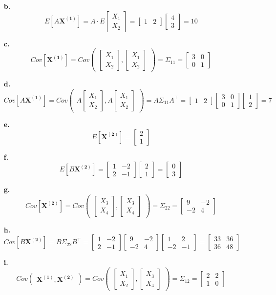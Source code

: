 \documentclass[oneside,12pt,letterpaper]{article}
\newcommand\m[1]{\begin{bmatrix}#1\end{bmatrix}}
\newcommand\p[1]{\begin{pmatrix}#1\end{pmatrix}}
\begin{document}
\begin{enumerate}
\begin{enumerate}
				\item[\textbf{b.}]
					$$E[A\boldsymbol{X^{(1)}}] 
					= A \cdot E\m{X_{1}\\X_{2}} 
					= \m{1&2} \m{4\\3} 
					= 10$$
				
				\item[\textbf{c.}]
					$$Cov[\boldsymbol{X^{(1)}}] 
					= Cov\p{\m{X_{1}\\X_{2}}, \m{X_{1}\\X_{2}}} 
					= \Sigma_{11} 
					= \m{3&0\\0&1}$$

				\item[\textbf{d.}]
					$$Cov[A\boldsymbol{X^{(1)}}] 
					= Cov\p{A\m{X_{1}\\X_{2}}, A\m{X_{1}\\X_{2}}} 
					= A\Sigma_{11}A^{\intercal} 
					= \m{1&2} \m{3&0\\0&1} \m{1\\2}
					= 7$$
	
				\item[\textbf{e.}]
					$$E[\boldsymbol{X^{(2)}}] 
					= \m{2\\1}$$

				\item[\textbf{f.}]
					$$E[B\boldsymbol{X^{(2)}}] 
					= \m{1&-2\\2&-1} \m{2\\1} 
					= \m{0\\3}$$
	
				\item[\textbf{g.}]
					$$Cov[\boldsymbol{X^{(2)}}] 
					= Cov\p{\m{X_{3}\\X_{4}}, \m{X_{3}\\X_{4}}} 
					= \Sigma_{22} 
					= \m{9&-2\\-2&4}$$

				\item[\textbf{h.}]
					$$Cov[B\boldsymbol{X^{(2)}}] 
					= B \Sigma_{22} B^{\intercal}
					= \m{1&-2\\2&-1} \m{9&-2\\-2&4} \m{1&2\\-2&-1}
					= \m{33&36\\36&48}$$

				\item[\textbf{i.}]
					$$Cov\p{\boldsymbol{X^{(1)}},\boldsymbol{X^{(2)}}} 
					= Cov\p{\m{X_{1}\\X_{2}}, \m{X_{3}\\X_{4}}} 
					= \Sigma_{12} 
					= \m{2&2\\1&0}$$


\end{enumerate}
\end{enumerate}
\end{document}
